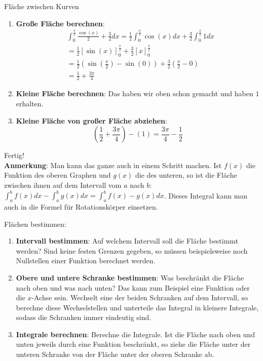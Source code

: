 \begin{bla}{Fläche zwischen Kurven}
  \begin{enumerate}
    \item \textbf{Große Fläche berechnen}:
    \begin{equation*}
      \begin{split}
        & \int_{0}^{\frac{\pi}{2}} \frac{\cos(x)}{2}+\frac{3}{2}dx = \frac{1}{2} \int_{0}^{\frac{\pi}{2}} \cos(x)dx + \frac{3}{2} \int_{0}^{\frac{\pi}{2}} 1dx \\
        &= \frac{1}{2}{[\sin(x)]}_{0}^{\frac{\pi}{2}}+\frac{3}{2} {[x]}_{0}^{\frac{\pi}{2}} \\
        &= \frac{1}{2}\left( \sin\left(\frac{\pi}{2}\right) - \sin(0) \right) + \frac{3}{2} \left( \frac{\pi}{2} - 0 \right) \\
        &= \frac{1}{2} + \frac{3\pi}{4}
      \end{split}
    \end{equation*}

    \item \textbf{Kleine Fläche berechnen}: Das haben wir oben schon gemacht und haben $1$ erhalten.

    \item \textbf{Kleine Fläche von großer Fläche abziehen}:
    \begin{equation*}
      \left(\frac{1}{2}+\frac{3\pi}{4}\right) - (1) = \frac{3\pi}{4}-\frac{1}{2}
    \end{equation*}
  \end{enumerate}
  Fertig! \\
  \textbf{Anmerkung}: Man kann das ganze auch in einem Schritt machen. Ist $f(x)$ die Funktion des oberen Graphen und $g(x)$ die des unteren, so ist die Fläche zwischen ihnen auf dem Intervall vom $a$ nach $b$: $\int_{a}^{b} f(x)dx - \int_{a}^{b} g(x)dx = \int_{a}^{b} f(x)-g(x)dx$. Dieses Integral kann man auch in die Formel für Rotationskörper einsetzen.
\end{bla}

\begin{koch}
  Flächen bestimmen:
  \begin{enumerate}
    \item \textbf{Intervall bestimmen}: Auf welchem Intervall soll die Fläche bestimmt werden? Sind keine festen Grenzen gegeben, so müssen beispielsweise noch Nullstellen einer Funktion berechnet werden.
    \item \textbf{Obere und untere Schranke bestimmen}: Was beschränkt die Fläche nach oben und was nach unten? Das kann zum Beispiel eine Funktion oder die $x$-Achse sein. Wechselt eine der beiden Schranken auf dem Intervall, so berechne diese Wechselstellen und unterteile das Integral in kleinere Integrale, sodass die Schranken immer eindeutig sind.
    \item \textbf{Integrale berechnen}: Berechne die Integrale. Ist die Fläche nach oben und unten jeweils durch eine Funktion beschränkt, so ziehe die Fläche unter der unteren Schranke von der Fläche unter der oberen Schranke ab.
  \end{enumerate}
\end{koch}
